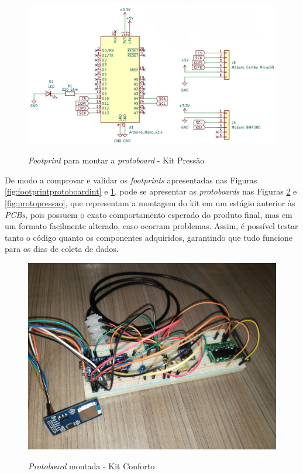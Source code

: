\documentclass[acronym,symbols,table]{fei}
\begin{document}
\begin{figure}[!htb] 
\centering
    \caption{\textit{Footprint} para montar a \textit{protoboard} - Kit Pressão}
    \includegraphics[width=1\linewidth]{Imagens/footprintpressao.jpg} 
    \label{fig:footprintpressao}
\end{figure}

De modo a comprovar e validar os \textit{footprints} apresentadas nas Figuras \ref{fig:footprintprotoboardint} e \ref{fig:footprintpressao}, pode se apresentar as \textit{protoboards} nas Figuras \ref{fig:protoconforto} e \ref{fig:protopressao}, que representam a montagem do kit em um estágio anterior às \textit{PCBs}, pois possuem o exato comportamento esperado do produto final, mas em um formato facilmente alterado, caso ocorram problemas. Assim, é possível testar tanto o código quanto os componentes adquiridos, garantindo que tudo funcione para os dias de coleta de dados.

\begin{figure}[!htb]
\centering
    \caption{\textit{Protoboard} montada - Kit Conforto}
    \includegraphics[width=0.65\linewidth]{Imagens/protoboardmovel.jpeg}
    \label{fig:protoconforto}
\end{figure}
\end{document}

